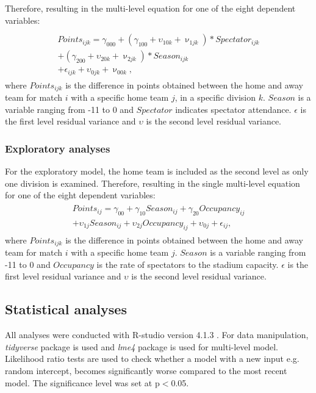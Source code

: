 Therefore, resulting in the multi-level equation for one of the eight dependent variables:
\begin{align}
\begin{split} \label{eq:3}\\
    Points_{ijk} = \gamma_{000} + (\gamma_{100}+ \upsilon_{10k} + \upnu_{1jk}) * Spectator_{ijk} \\
    + (\gamma_{200}+ \upsilon_{20k} + \upnu_{2jk}) * Season_{ijk} \\
    + \epsilon_{ijk} + \upsilon_{0jk} + \upnu_{00k},
\end{split}
\end{align}
\noindent
where $Points_{ijk}$ is the difference in points obtained between the home and away team for match $i$ with a specific home team $j$, in a specific division $k$. $Season$ is a variable ranging from -11 to 0 and $Spectator$ indicates spectator attendance. $\epsilon$ is the first level residual variance and $\upsilon$ is the second level residual variance.

\subsubsection{Exploratory analyses}
For the exploratory model, the home team is included as the second level as only one division is examined. Therefore, resulting in the single multi-level equation for one of the eight dependent variables:
\begin{align}
\begin{split}
    Points_{ij} = \gamma_{00} + \gamma_{10} Season_{ij} + \gamma_{20} Occupancy_{ij} \\
     + \upsilon_{1j} Season_{ij}+ \upsilon_{2j} Occupancy_{ij} + \upsilon_{0j} + \epsilon_{ij},
\end{split}
\end{align}
\noindent
where $Points_{ijk}$ is the difference in points obtained between the home and away team for match $i$ with a specific home team $j$. $Season$ is a variable ranging from -11 to 0 and $Occupancy$ is the rate of spectators to the stadium capacity. $\epsilon$ is the first level residual variance and $\upsilon$ is the second level residual variance.

\subsection{Statistical analyses}
All analyses were conducted with R-studio version 4.1.3 \cite{team2020rstudio}. For data manipulation, \textit{tidyverse} package is used and \textit{lme4} package is used for multi-level model. Likelihood ratio tests are used to check whether a model with a new input e.g. random intercept, becomes significantly worse compared to the most recent model. The significance level was set at p$<$0.05.

